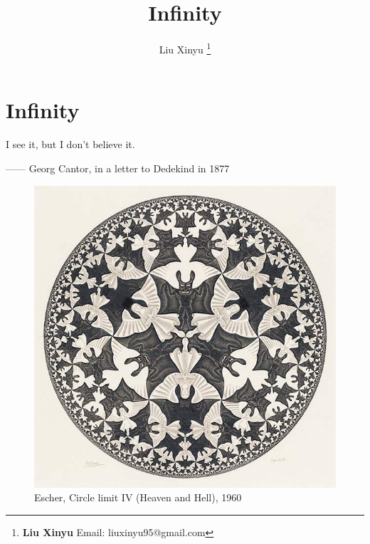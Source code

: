 \documentclass{article}
\begin{document}
\title{Infinity}

\author{Liu Xinyu
\thanks{{\bfseries Liu Xinyu} \newline
  Email: liuxinyu95@gmail.com \newline}
  }

\maketitle
\fi


\ifx\wholebook\relax
\chapter{Infinity}
\fi

\epigraph{I see it, but I don't believe it.}{ —— Georg Cantor, in a letter to Dedekind in 1877}


\begin{figure}
 \centering
 \includegraphics[scale=0.3]{img/circle-limit-IV-1960.jpg}
 \captionsetup{labelformat=empty}
 \caption{Escher, Circle limit IV (Heaven and Hell), 1960}
 \label{fig:Circle-Limit-IV}
\end{figure}
\end{document}

